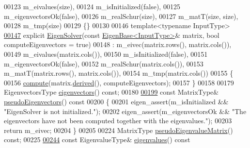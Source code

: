 \begin{DoxyCode}
00123         m\_eivalues(size),
00124         m\_isInitialized(false),
00125         m\_eigenvectorsOk(false),
00126         m\_realSchur(size),
00127         m\_matT(size, size), 
00128         m\_tmp(size)
00129     \{\}
00130 
00146     \textcolor{keyword}{template}<\textcolor{keyword}{typename} InputType>
\hyperlink{group___eigenvalues___module_a7e8ab3d89ea525af5f27f1a8e805fae1}{00147}     \textcolor{keyword}{explicit} \hyperlink{group___eigenvalues___module_a7e8ab3d89ea525af5f27f1a8e805fae1}{EigenSolver}(\textcolor{keyword}{const} \hyperlink{group___core___module_struct_eigen_1_1_eigen_base}{EigenBase<InputType>}& matrix, \textcolor{keywordtype}{bool} 
      computeEigenvectors = \textcolor{keyword}{true})
00148       : m\_eivec(matrix.rows(), matrix.cols()),
00149         m\_eivalues(matrix.cols()),
00150         m\_isInitialized(false),
00151         m\_eigenvectorsOk(false),
00152         m\_realSchur(matrix.cols()),
00153         m\_matT(matrix.rows(), matrix.cols()), 
00154         m\_tmp(matrix.cols())
00155     \{
00156       \hyperlink{group___eigenvalues___module_a38d032b75b3e75640e3db42e7ab20c24}{compute}(matrix.\hyperlink{group___core___module_a324b16961a11d2ecfd2d1b7dd7946545}{derived}(), computeEigenvectors);
00157     \}
00158 
00179     EigenvectorsType \hyperlink{group___eigenvalues___module_a66288022802172e3ee059283b26201d7}{eigenvectors}() \textcolor{keyword}{const};
00180 
\hyperlink{group___eigenvalues___module_a4e796226f06e1f7347cf03a38755a155}{00199}     \textcolor{keyword}{const} MatrixType& \hyperlink{group___eigenvalues___module_a4e796226f06e1f7347cf03a38755a155}{pseudoEigenvectors}()\textcolor{keyword}{ const}
00200 \textcolor{keyword}{    }\{
00201       eigen\_assert(m\_isInitialized && \textcolor{stringliteral}{"EigenSolver is not initialized."});
00202       eigen\_assert(m\_eigenvectorsOk && \textcolor{stringliteral}{"The eigenvectors have not been computed together with the
       eigenvalues."});
00203       \textcolor{keywordflow}{return} m\_eivec;
00204     \}
00205 
00224     MatrixType \hyperlink{group___eigenvalues___module_a4979eafe0aeef06b19ada7fa5e19db17}{pseudoEigenvalueMatrix}() \textcolor{keyword}{const};
00225 
\hyperlink{group___eigenvalues___module_a114189009e42f5e03372a7a3dfa33b97}{00244}     \textcolor{keyword}{const} EigenvalueType& \hyperlink{group___eigenvalues___module_a114189009e42f5e03372a7a3dfa33b97}{eigenvalues}()\textcolor{keyword}{ const}

\end{DoxyCode}
